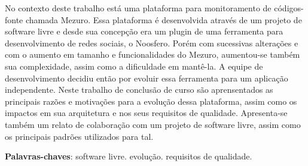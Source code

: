 \begin{resumo}

No contexto deste trabalho está uma plataforma para monitoramento de códigos-fonte chamada Mezuro. Essa plataforma é desenvolvida através de um projeto de software livre e desde sua concepção era um plugin de uma ferramenta para desenvolvimento de redes sociais, o Noosfero.
%
Porém com sucessivas alterações e com o aumento em tamanho e funcionalidades do Mezuro, aumentou-se também sua complexidade, assim como a dificuldade em mantê-la. A equipe de desenvolvimento decidiu então por evoluir essa ferramenta para um aplicação independente.
%
Neste trabalho de conclusão de curso são aprensentados as principais razões e motivações para a evolução dessa plataforma, assim como os impactos em sua arquitetura e nos seus requisitos de qualidade.
%
Apresenta-se também um relato de colaboração com um projeto de software livre, assim como os principais padrões utilizados para tal.

 \vspace{\onelineskip}
    
 \noindent
 \textbf{Palavras-chaves}: software livre. evolução. requisitos de qualidade.
\end{resumo}
